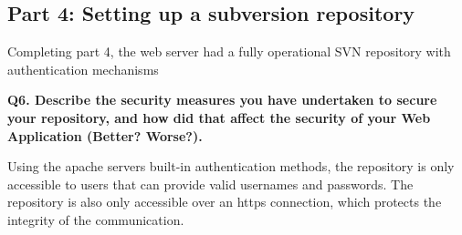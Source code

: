 \subsection {Part 4: Setting up a subversion repository}
Completing part 4, the web server had a fully operational SVN repository with authentication mechanisms
\newline

\noindent
{\bf Q6. Describe the security measures you have undertaken to secure your
repository, and how did that affect the security of your Web Application
(Better? Worse?).}
\newline

\noindent
Using the apache servers built-in authentication methods, the repository is only accessible to users that can provide valid usernames and passwords. The repository is also only accessible over an https connection, which protects the integrity of the communication. 



